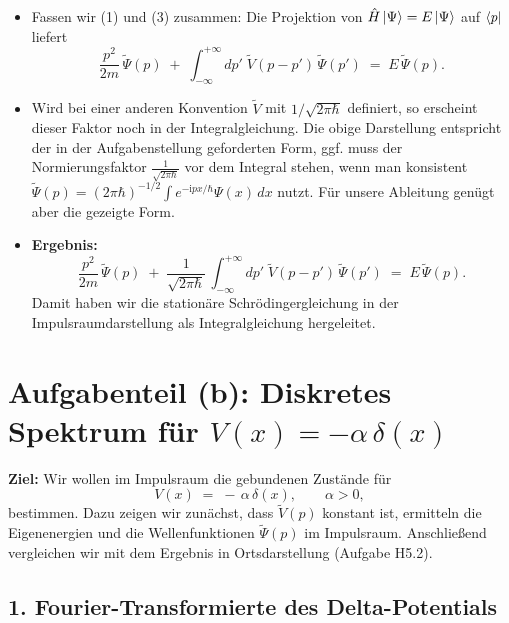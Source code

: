 \documentclass[12pt,a4paper]{scrartcl}
\begin{document}
\begin{itemize}
  \item Fassen wir (1) und (3) zusammen: Die Projektion von $\hat H\ket{\Psi}=E\ket{\Psi}$ auf $\bra{p}$ liefert
  \[
    \frac{p^2}{2m}\,\widetilde\Psi(p) \;+\; \int_{-\infty}^{+\infty} dp'\;\widetilde V(p - p')\,\widetilde\Psi(p') \;=\; E\,\widetilde\Psi(p).
  \]
  \item Wird bei einer anderen Konvention $\widetilde V$ mit $1/\sqrt{2\pi\hbar}$ definiert, so erscheint dieser Faktor noch in der Integralgleichung. Die obige Darstellung entspricht der in der Aufgabenstellung geforderten Form, ggf. muss der Normierungsfaktor $\frac{1}{\sqrt{2\pi\hbar}}$ vor dem Integral stehen, wenn man konsistent $\widetilde\Psi(p)=(2\pi\hbar)^{-1/2}\int e^{-\mathrm{i}px/\hbar}\Psi(x)\,dx$ nutzt. Für unsere Ableitung genügt aber die gezeigte Form.
  \item \textbf{Ergebnis:} 
  \[
    \boxed{
      \frac{p^2}{2m}\,\widetilde\Psi(p)
      \;+\; \frac{1}{\sqrt{2\pi\hbar}}\,\int_{-\infty}^{+\infty} dp'\;\widetilde V(p - p')\,\widetilde\Psi(p')
      \;=\; E\,\widetilde\Psi(p).
    }
  \]
  Damit haben wir die stationäre Schrödingergleichung in der Impulsraumdarstellung als Integralgleichung hergeleitet.
\end{itemize}

\newpage
\section{Aufgabenteil (b): Diskretes Spektrum für $V(x) = -\alpha\,\delta(x)$}

\textbf{Ziel:} Wir wollen im Impulsraum die gebundenen Zustände für
\[
   V(x) \;=\; -\,\alpha\,\delta(x), \qquad \alpha>0,
\]
bestimmen. Dazu zeigen wir zunächst, dass $\widetilde V(p)$ konstant ist, ermitteln die Eigenenergien und die Wellenfunktionen $\widetilde\Psi(p)$ im Impulsraum. Anschließend vergleichen wir mit dem Ergebnis in Ortsdarstellung (Aufgabe H5.2).

\subsection*{1. Fourier-Transformierte des Delta-Potentials}
\end{document}
